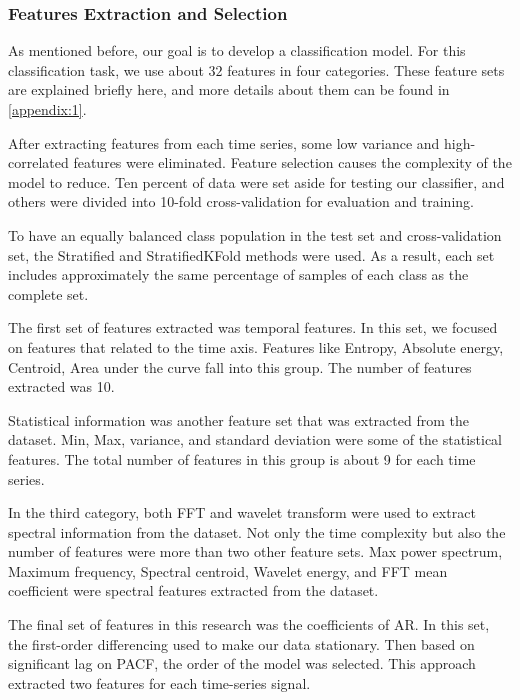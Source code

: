 \subsubsection{Features Extraction and Selection}

As mentioned before, our goal is to develop a classification model. For this classification task, we use about $32$ features in four categories. These feature sets are explained briefly here, and more details about them can be found in \ref{appendix:1}.

After extracting features from each time series, some low variance and high-correlated features were eliminated. Feature selection causes the complexity of the model to reduce. Ten percent of data were set aside for testing our classifier, and others were divided into 10-fold cross-validation for evaluation and training. 

To have an equally balanced class population in the test set and cross-validation set, the Stratified and StratifiedKFold methods were used. As a result, each set includes approximately the same percentage of samples of each class as the complete set. %


The first set of features extracted was temporal features. In this set, we focused on features that related to the time axis. Features like Entropy, Absolute energy, Centroid, Area under the curve fall into this group. The number of features extracted was 10.

Statistical information was another feature set that was extracted from the dataset. Min, Max, variance, and standard deviation were some of the statistical features. The total number of features in this group is about 9 for each time series.  

In the third category, both FFT and wavelet transform were used to extract spectral information from the dataset. Not only the time complexity but also the number of features were more than two other feature sets. 
Max power spectrum, Maximum frequency, Spectral centroid, Wavelet energy, and FFT mean coefficient were spectral features extracted from the dataset.

The final set of features in this research was the coefficients of \gls{AR}. In this set, the first-order differencing used to make our data stationary. Then based on significant lag on \gls{PACF}, the order of the model  was selected. This approach extracted two features for each time-series signal.

